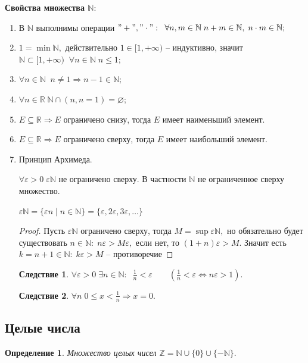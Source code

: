 \documentclass{article}
\newtheorem{Corollary}{Следствие}[section]
\newtheorem{Definition}{Определение}[section]
\begin{document}
\par\medskip \textbf{Свойства множества $\mathbb{N}:$}\par
\begin{enumerate}
\item В $\mathbb{N}$ выполнимы операции $"+", "\cdot": \;\; \forall n, m\in\mathbb{N} \; n+m\in\mathbb{N}, \; n\cdot m\in\mathbb{N};$
\item $1=\min\mathbb{N},$ действительно $1\in[1, +\infty)$ -- индуктивно, значит $\mathbb{N}\subset[1, +\infty)\;\; \forall n\in\mathbb{N} \; n\leq1;$
\item $\forall n\in\mathbb{N}\;\; n\neq 1 \Rightarrow n-1\in\mathbb{N};$
\item $\forall n\in\mathbb{R} \; \mathbb{N}\cap (n, n=1)=\varnothing;$
\item $E\subseteq\mathbb{R} \Rightarrow E$ ограничено снизу, тогда $E$ имеет наименьший элемент.
\item $E\subseteq\mathbb{R} \Rightarrow E$ ограничено сверху, тогда $E$ имеет наибольший элемент.
\item Принцип Архимеда.
\par $\forall\varepsilon>0\; \varepsilon\mathbb{N}$ не ограничено сверху. В частности $\mathbb{N}$ не ограниченное сверху множество. 

$\varepsilon\mathbb{N}=\{\varepsilon n\mid n\in\mathbb{N}\}=\{\varepsilon, 2\varepsilon, 3\varepsilon,\ldots\}$
\begin{proof}
Пусть $\varepsilon\mathbb{N}$ ограничено сверху, тогда $M=\sup\varepsilon\mathbb{N},$ но обязательно будет существовать $n\in\mathbb{N}: \; n\varepsilon>M\varepsilon,$ если нет, то $(1+n)\varepsilon>M.$ Значит есть $k=n+1\in\mathbb{N}: \; k\varepsilon>M$ -- противоречие
\end{proof}

\begin{Corollary}
$\forall\varepsilon>0 \; \exists n\in\mathbb{N}: \;\; \frac{1}{n}<\varepsilon \qquad \left(\frac{1}{n}<\varepsilon \Leftrightarrow n\varepsilon>1\right).$
\end{Corollary}

\begin{Corollary}
$\forall n \; 0\leq x<\frac{1}{n} \Rightarrow x=0.$
\end{Corollary}
\end{enumerate}

\subsection{Целые числа}
\begin{Definition}
Множество целых чисел $\mathbb{Z}=\mathbb{N}\cup\{0\}\cup\{-\mathbb{N}\}.$
\end{Definition}
\end{document}
